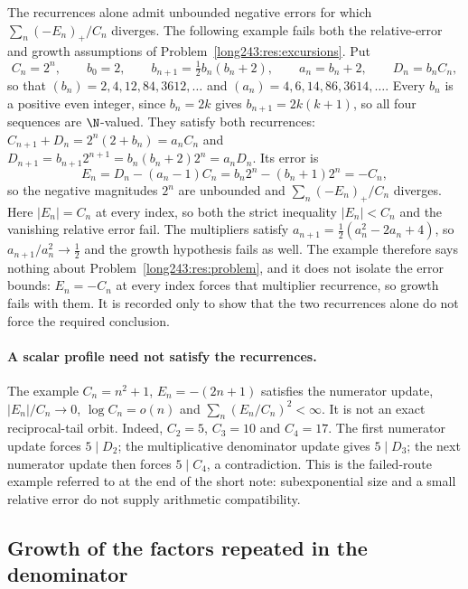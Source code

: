 \begin{remark}\label{long243:rem:recurrence-without-relative-bound}
The recurrences alone admit unbounded negative errors for which
$\sum_n(-E_n)_+/C_n$ diverges. The following example fails both the
relative-error and growth assumptions of Problem~\ref{long243:res:excursions}. Put
\[
 C_n=2^{n},\qquad b_0=2,\qquad b_{n+1}=\tfrac12 b_n(b_n+2),\qquad
 a_n=b_n+2,\qquad D_n=b_nC_n ,
\]
so that $(b_n)=2,4,12,84,3612,\ldots$ and $(a_n)=4,6,14,86,3614,\ldots$.  Every
$b_n$ is a positive even integer, since $b_n=2k$ gives $b_{n+1}=2k(k+1)$, so all
four sequences are $\N$-valued. They satisfy both recurrences:
$C_{n+1}+D_n=2^{n}(2+b_n)=a_nC_n$ and
$D_{n+1}=b_{n+1}2^{n+1}=b_n(b_n+2)2^{n}=a_nD_n$.  Its error is
\[
 E_n=D_n-(a_n-1)C_n=b_n2^{n}-(b_n+1)2^{n}=-C_n ,
\]
so the negative magnitudes $2^{n}$ are unbounded and $\sum_n(-E_n)_+/C_n$
diverges. Here $|E_n|=C_n$ at every index, so both the strict inequality
$|E_n|<C_n$ and the vanishing relative error fail. The
multipliers satisfy $a_{n+1}=\tfrac12(a_n^{2}-2a_n+4)$, so
$a_{n+1}/a_n^{2}\to\tfrac12$ and the growth hypothesis fails as well.  The
example therefore says nothing about Problem~\ref{long243:res:problem}, and it does not
isolate the error bounds: $E_n=-C_n$ at every index forces that
multiplier recurrence, so growth fails with them.  It is recorded only to show
that the two recurrences alone do not force the required conclusion.
\end{remark}

\paragraph{A scalar profile need not satisfy the recurrences.}
The example $C_n=n^2+1$, $E_n=-(2n+1)$ satisfies the numerator update,
$|E_n|/C_n\to0$, $\log C_n=o(n)$ and $\sum_n(E_n/C_n)^2<\infty$.
It is not an exact reciprocal-tail orbit. Indeed, $C_2=5$, $C_3=10$
and $C_4=17$. The first numerator update forces $5\mid D_2$; the
multiplicative denominator update gives $5\mid D_3$; the next numerator
update then forces $5\mid C_4$, a contradiction. This is the failed-route
example referred to at the end of the short note: subexponential size
and a small relative error do not supply arithmetic compatibility.

\subsection{Growth of the factors repeated in the denominator}

